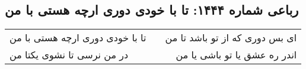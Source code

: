\begin{center}
\section*{رباعی شماره ۱۴۴۴: تا با خودی دوری ارچه هستی با من}
\label{sec:1444}
\begin{longtable}{l p{0.5cm} r}
تا با خودی دوری ارچه هستی با من
&&
ای بس دوری که از تو باشد تا من
\\
در من نرسی تا نشوی یکتا من
&&
اندر ره عشق یا تو باشی یا من
\\
\end{longtable}
\end{center}
